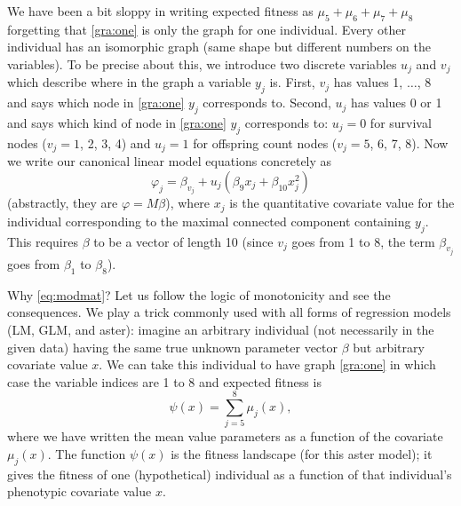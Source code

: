 \documentclass[11pt]{article}
\begin{document}
We have been a bit sloppy in writing expected fitness as
$\mu_5 + \mu_6 + \mu_7 + \mu_8$ forgetting that \eqref{gra:one} is only
the graph for one individual.  Every other individual has an isomorphic
graph (same shape but different numbers on the variables).  To be precise
about this, we introduce two discrete variables $u_j$ and $v_j$ which describe
where in the graph a variable $y_j$ is.  First, $v_j$ has values 1, $\ldots$, 8
and says which node in \eqref{gra:one} $y_j$ corresponds to.
Second, $u_j$ has values 0 or 1 and says which kind of node in \eqref{gra:one}
$y_j$ corresponds to: $u_j = 0$ for survival nodes ($v_j = 1$, 2, 3, 4)
and $u_j = 1$ for offspring count nodes ($v_j = 5$, 6, 7, 8).
Now we write our canonical linear model equations
concretely as
\begin{equation} \label{eq:modmat}
   \varphi_j = \beta_{v_j} + u_j (\beta_9 x_j + \beta_{10} x_j^2)
\end{equation}
(abstractly, they are $\varphi = M \beta$),
where $x_j$ is the quantitative covariate value for the individual corresponding
to the maximal connected component containing $y_j$.
This requires $\beta$ to be a vector of length 10 (since $v_j$ goes from
1 to 8, the term $\beta_{v_j}$ goes from $\beta_1$ to $\beta_8$).

Why \eqref{eq:modmat}?  Let us follow the logic of monotonicity and see
the consequences.  We play a trick commonly used
with all forms of regression models (LM, GLM, and aster):
imagine an arbitrary individual (not necessarily in the given data)
having the same true unknown parameter vector $\beta$
but arbitrary covariate value $x$.
We can take this individual to have
graph \eqref{gra:one} in which case the variable indices are 1 to 8 and
expected fitness is
\begin{equation} \label{eq:sigh}
   \psi(x) = \sum_{j = 5}^8 \mu_j(x),
\end{equation}
where we have written the mean value parameters as a function of the covariate
$\mu_j(x)$.  The function $\psi(x)$
is the fitness landscape (for this aster model); it gives the fitness of one
(hypothetical) individual as a function of that individual's phenotypic
covariate value $x$.
\end{document}

